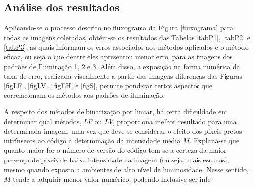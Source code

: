 \documentclass{ceel}
\begin{document}
\begin{multicols}{2}
\begin{minipage}[h]{\columnwidth}
\vspace{-0.1cm}
\caption{Imagens resultantes da Binarização Pós Equalização por Histograma para o QR Code 3 nos padrões de (a) Iluminação 1, (c) Iluminação 2 e (e) Iluminação 3, com suas respectivas imagens diferença em (b), (d) e (f).} \label{figEH}
\end{minipage}

\section{Análise dos resultados} \label{resultados}
Aplicando-se o processo descrito no fluxograma da Figura \ref{fluxograma} para todas as imagens coletadas, obtém-se os resultados das Tabelas \ref{tabP1}, \ref{tabP2} e \ref{tabP3}, as quais informam os erros associados aos métodos aplicados e o método eficaz, ou seja o que dentre eles apresentou menor erro, para as imagens dos padrões de Iluminação 1, 2 e 3. 
Além disso, a exposição na forma numérica da taxa de erro, realizada visualmente a partir das imagens diferenças das Figuras \ref{figLF}, \ref{figLV}, \ref{figEH} e \ref{figS}, permite ponderar certos aspectos que correlacionam os métodos aos padrões de iluminação.

A respeito dos métodos de binarização por limiar, há certa dificuldade em determinar qual métodos, \emph{LF} ou \emph{LV}, proporciona melhor resultado para uma determinada imagem, uma vez que deve-se considerar o efeito dos píxeis pretos intrínsecos ao código a determinação da intensidade média $M$. Explana-se que quanto maior for o número de versão do código tem-se a certeza da maior presença de píxeis de baixa intensidade na imagem (ou seja, mais escuros), mesmo quando exposto a ambientes de alto nível de luminosidade. Nesse sentido, $M$ tende a adquirir menor valor numérico, podendo inclusive ser infe-
\columnbreak


\end{multicols}
\end{document}
